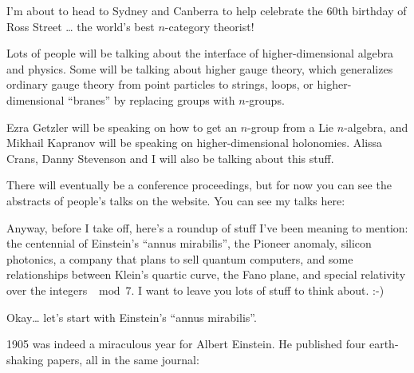 \documentclass{article}
\def\tightlist{}
\renewcommand{\texttt}[1]{%
  \begingroup
  \ttfamily
  \begingroup\lccode`~=`/\lowercase{\endgroup\def~}{/\discretionary{}{}{}}%
  \begingroup\lccode`~=`[\lowercase{\endgroup\def~}{[\discretionary{}{}{}}%
  \begingroup\lccode`~=`.\lowercase{\endgroup\def~}{.\discretionary{}{}{}}%
  \catcode`/=\active\catcode`[=\active\catcode`.=\active
  \scantokens{#1\noexpand}%
  \endgroup
}
\begin{document}
I'm about to head to Sydney and Canberra to help celebrate the 60th
birthday of Ross Street \ldots{} the world's best \(n\)-category
theorist!


Lots of people will be talking about the interface of higher-dimensional
algebra and physics. Some will be talking about higher gauge theory,
which generalizes ordinary gauge theory from point particles to strings,
loops, or higher-dimensional ``branes'' by replacing groups with
\(n\)-groups.

Ezra Getzler will be speaking on how to get an \(n\)-group from a Lie
\(n\)-algebra, and Mikhail Kapranov will be speaking on
higher-dimensional holonomies. Alissa Crans, Danny Stevenson and I will
also be talking about this stuff.

There will eventually be a conference proceedings, but for now you can
see the abstracts of people's talks on the website. You can see my talks
here:


Anyway, before I take off, here's a roundup of stuff I've been meaning
to mention: the centennial of Einstein's ``annus mirabilis'', the
Pioneer anomaly, silicon photonics, a company that plans to sell quantum
computers, and some relationships between Klein's quartic curve, the
Fano plane, and special relativity over the integers \(\mod 7\). I want
to leave you lots of stuff to think about. :-)

Okay\ldots{} let's start with Einstein's ``annus mirabilis''.

1905 was indeed a miraculous year for Albert Einstein. He published four
earth-shaking papers, all in the same journal:
\end{document}
